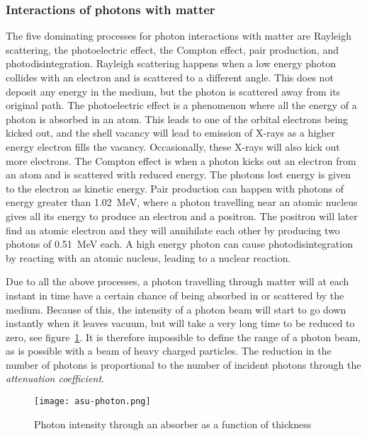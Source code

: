 \documentclass[../main/thesis.tex]{subfiles}
\begin{document}
\subsubsection{Interactions of photons with matter}
\label{t-photon}
The five dominating processes for photon interactions with matter are Rayleigh scattering, the photoelectric effect, the Compton effect, pair production, and photodisintegration. Rayleigh scattering happens when a low energy photon collides with an electron and is scattered to a different angle. This does not deposit any energy in the medium, but the photon is scattered away from its original path. The photoelectric effect is a phenomenon where all the energy of a photon is absorbed in an atom. This leads to one of the orbital electrons being kicked out, and the shell vacancy will lead to emission of X-rays as a higher energy electron fills the vacancy. Occasionally, these X-rays will also kick out more electrons. The Compton effect is when a photon kicks out an electron from an atom and is scattered with reduced energy. The photons lost energy is given to the electron as kinetic energy. Pair production can happen with photons of energy greater than 1.02~MeV, where a photon travelling near an atomic nucleus gives all its energy to produce an electron and a positron. The positron will later find an atomic electron and they will annihilate each other by producing two photons of 0.51~MeV each. A high energy photon can cause photodisintegration by reacting with an atomic nucleus, leading to a nuclear reaction. \citep[chap. 2 $\&$ 5]{Khan} 

Due to all the above processes, a photon travelling through matter will at each instant in time have a certain chance of being absorbed in or scattered by the medium. Because of this, the intensity of a photon beam will start to go down instantly when it leaves vacuum, but will take a very long time to be reduced to zero, see figure~\ref{fig-photon}. It is therefore impossible to define the range of a photon beam, as is possible with a beam of heavy charged particles. The reduction in the number of photons is proportional to the number of incident photons through the \textit{attenuation coefficient}. \citep[chap. 5]{Khan} 

\begin{figure}[h]
	\centering
	\texttt{[image: asu-photon.png]}%
	\caption{Photon intensity through an absorber as a function of thickness \citep{asu2000}}
	\label{fig-photon}
\end{figure}
\end{document}

